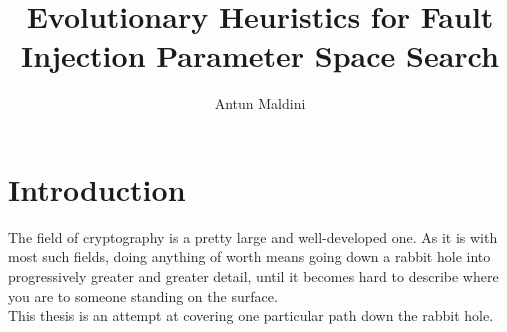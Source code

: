 \documentclass[times, utf8, diplomski]{fer}
\begin{document}

\title{Evolutionary Heuristics for Fault Injection Parameter Space Search}

\author{Antun Maldini}

\maketitle

\izvornik

\zahvala{}

\tableofcontents



% 
% 
% 
% 



\chapter{Introduction}\label{ch:introduction}
The field of cryptography is a pretty large and well-developed one. As it is
with most such fields, doing anything of worth means going down a rabbit hole
into progressively greater and greater detail, until it becomes hard to describe
where you are to someone standing on the surface. \\
This thesis is an attempt at covering one particular path down the rabbit hole.
\end{document}
